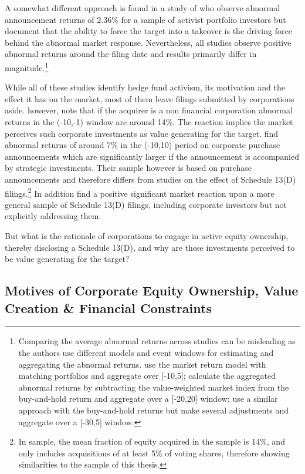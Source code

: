 \documentclass[12pt]{article}
\begin{document}
A somewhat different approach is found in a study of \citet[p.363]{Greenwood2009} who observe abnormal announcement returns of 2.36\% for a sample of activist portfolio investors but document that the ability to force the target into a takeover is the driving force behind the abnormal market response. Nevertheless, all studies observe positive abnormal returns around the filing date and results primarily differ in magnitude.\footnote{Comparing the average abnormal returns across studies can be misleading as the authors use different models and event windows for estimating and aggregating the abnormal returns. \citet{Greenwood2009} use the market return model with matching portfolios and aggregate over [-10,5]; \citet{Brav2008} calculate the aggregated abnormal returns by subtracting the value-weighted market index from the buy-and-hold return and aggregate over a [-20,20] window; \citet{Klein2009} use a similar approach with the buy-and-hold returns but make several adjustments and aggregate over a [-30,5] window.}\par
While all of these studies identify hedge fund activism, its motivation and the effect it has on the market, most of them leave filings submitted by corporations aside. \citet[p.29]{Brigida2012} however, note that if the acquirer is a non financial corporation abnormal returns in the (-10,-1) window are around 14\%. The reaction implies the market perceives such corporate investments as value generating for the target. \citet[p.2803]{Allen2000} find abnormal returns of around 7\% in the (-10,10) period on corporate purchase announcements which are significantly larger if the announcement is accompanied by strategic investments. Their sample however is based on purchase announcements and therefore differs from studies on the effect of Schedule 13(D) filings.\footnote{In \citet[p.2801]{Allen2000} sample, the mean fraction of equity acquired in the sample is 14\%, and  only includes acquisitions of at least 5\% of voting shares, therefore showing similarities to the sample of this thesis.} In addition \citet{Collin-Dufresne2015} find a positive significant market reaction upon a more general sample of Schedule 13(D) filings, including corporate investors but not explicitly addressing them.\par
But what is the rationale of corporations to engage in active equity ownership, thereby disclosing a Schedule 13(D), and why are these investments perceived to be value generating for the target?

\subsection{Motives of Corporate Equity Ownership, Value Creation \& Financial Constraints}
\end{document}
